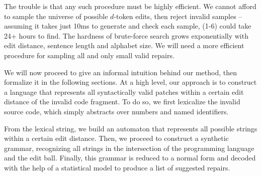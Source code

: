 \documentclass[runningheads]{llncs}
\begin{document}
  The trouble is that any such procedure must be highly efficient. We cannot afford to sample the universe of possible $d$-token edits, then reject invalid samples -- assuming it takes just 10ms to generate and check each sample, (1-6) could take 24+ hours to find. The hardness of brute-force search grows exponentially with edit distance, sentence length and alphabet size. We will need a more efficient procedure for sampling all and only small valid repairs.

  We will now proceed to give an informal intuition behind our method, then formalize it in the following sections. At a high level, our approach is to construct a language that represents all syntactically valid patches within a certain edit distance of the invalid code fragment. To do so, we first lexicalize the invalid source code, which simply abstracts over numbers and named identifiers.

  From the lexical string, we build an automaton that represents all possible strings within a certain edit distance. Then, we proceed to construct a synthetic grammar, recognizing all strings in the intersection of the programming language and the edit ball. Finally, this grammar is reduced to a normal form and decoded with the help of a statistical model to produce a list of suggested repairs.
\end{document}
